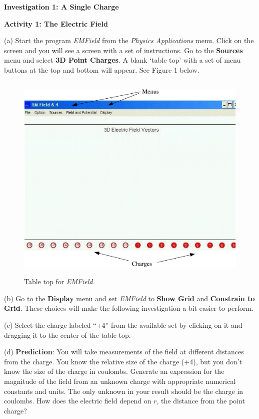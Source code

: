 \textbf{Investigation 1: A Single Charge}

\textbf{Activity 1: The Electric Field}

(a) Start the program {\it EMField} from the {\it Physics Applications} menu.
Click on the screen and you will see a screen with a set of
instructions.
Go to the \textbf{Sources} menu and select \textbf{3D Point Charges}.
A blank `table top' with a set of menu 
buttons at the top and bottom will appear. See Figure 1 below.

\begin{figure}[hbt]
\begin{center}
\includegraphics[height=4.0in]{electric_field_and_electric_potential/emfield1c.eps}
\caption{Table top for {\it EMField.}}
\end{center}
\end{figure}

(b) Go to the {\bf Display} menu and set {\it EMField} to
{\bf Show Grid} and {\bf Constrain to Grid}.
These choices will make the following investigation a bit easier to perform.

(c) Select
the charge labeled {}``+4'' from the available set by clicking
on it and dragging it to the center of the table top. 

(d) \textbf{Prediction}: You will take measurements of the field at different
distances from the charge. You know the relative size of the
charge (+4), but you don't know the size of the charge in coulombs.
Generate an expression for the magnitude of the field from an unknown charge
with appropriate numerical constants and units.
The only unknown in your result should be the charge in coulombs.
How does the electric field depend on $r$, the distance from the point charge?
\newpage

